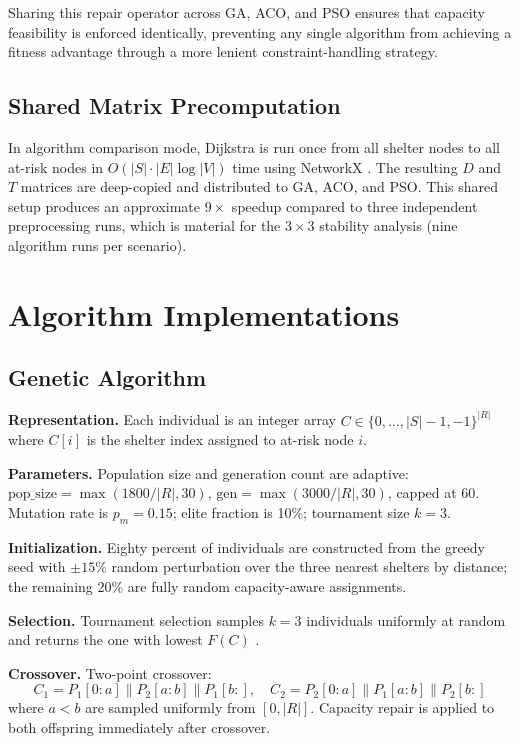 \documentclass[journal]{IEEEtran}
\begin{document}
Sharing this repair operator across GA, ACO, and PSO ensures that capacity feasibility is
enforced identically, preventing any single algorithm from achieving a fitness advantage
through a more lenient constraint-handling strategy.

\subsection{Shared Matrix Precomputation}

In algorithm comparison mode, Dijkstra is run once from all shelter nodes to all at-risk
nodes in $O(|S| \cdot |E| \log |V|)$ time using NetworkX \cite{hagberg2008}. The resulting
$D$ and $T$ matrices are deep-copied and distributed to GA, ACO, and PSO. This shared setup
produces an approximate $9\times$ speedup compared to three independent preprocessing runs,
which is material for the $3 \times 3$ stability analysis (nine algorithm runs per scenario).

\section{Algorithm Implementations}
\label{sec:algorithms}

\subsection{Genetic Algorithm}
\label{sec:ga}

\textbf{Representation.} Each individual is an integer array $C \in \{0,\ldots,|S|-1,-1\}^{|R|}$
where $C[i]$ is the shelter index assigned to at-risk node $i$.

\textbf{Parameters.} Population size and generation count are adaptive:
$\text{pop\_size} = \max(1800/|R|, 30)$, $\text{gen} = \max(3000/|R|, 30)$, capped at 60.
Mutation rate is $p_m = 0.15$; elite fraction is 10\%; tournament size $k = 3$.

\textbf{Initialization.} Eighty percent of individuals are constructed from the greedy seed
with $\pm15\%$ random perturbation over the three nearest shelters by distance; the
remaining 20\% are fully random capacity-aware assignments.

\textbf{Selection.} Tournament selection samples $k = 3$ individuals uniformly at random
and returns the one with lowest $F(C)$ \cite{holland1992}.

\textbf{Crossover.} Two-point crossover:
\begin{equation}
  C_1 = P_1[0:a] \mathbin{\|} P_2[a:b] \mathbin{\|} P_1[b:],\quad
  C_2 = P_2[0:a] \mathbin{\|} P_1[a:b] \mathbin{\|} P_2[b:]
  \label{eq:crossover}
\end{equation}
where $a < b$ are sampled uniformly from $[0, |R|]$. Capacity repair is applied to both
offspring immediately after crossover.
\end{document}
